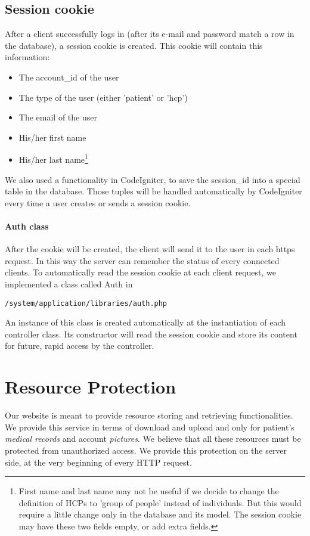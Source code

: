\subsection{Session cookie}
After a client successfully logs in (after its e-mail and password match a row in the database), a session cookie is created. This cookie will contain this information:
\begin{itemize}
\item The account\_id of the user
\item The type of the user (either 'patient' or 'hcp')
\item The email of the user
\item His/her first name
\item His/her last name\footnote{First name and last name may not be useful if we decide to change the definition of HCPs to 'group of people' instead of individuals. But this would require a little change only in the database and its model. The session cookie may have these two fields empty, or add extra fields.}
\end{itemize}
We also used a functionality in CodeIgniter, to save the session\_id into a special table in the database. Those tuples will be handled automatically by CodeIgniter every time a user creates or sends a session cookie.

\paragraph{Auth class}
After the cookie will be created, the client will send it to the user in each https request. In this way the server can remember the status of every connected clients. To automatically read the session cookie at each client request, we implemented a class called Auth in
\begin{verbatim}
/system/application/libraries/auth.php
\end{verbatim}
An instance of this class is created automatically at the instantiation of each controller class. Its constructor will read the session cookie and store its content for future, rapid access by the controller.




\section{Resource Protection}
Our website is meant to provide resource storing and retrieving functionalities. We provide this service in terms of download and upload and only for patient's \emph{medical records} and account \emph{pictures}. We believe that all these resources must be protected from unauthorized access. We provide this protection on the server side, at the very beginning of every HTTP request.

